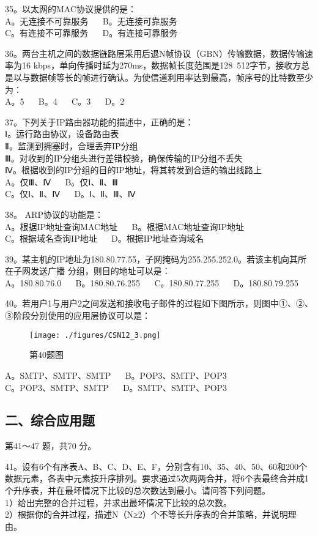 35。以太网的MAC协议提供的是：\\
A。无连接不可靠服务 $\quad$ B。无连接可靠服务 \\
C。有连接不可靠服务 $\quad$ D。有连接可靠服务

36。两台主机之间的数据链路层采用后退N帧协议（GBN）传输数据，数据传输速率为16 kbps，单向传播时延为270ms，数据帧长度范围是128~512字节，接收方总是以与数据帧等长的帧进行确认。为使信道利用率达到最高，帧序号的比特数至少为： \\
A。5 $\quad$ B。4 $\quad$ C。3 $\quad$ D。2

37。下列关于IP路由器功能的描述中，正确的是：\\
Ⅰ。运行路由协议，设备路由表 \\
Ⅱ。监测到拥塞时，合理丢弃IP分组 \\
Ⅲ。对收到的IP分组头进行差错校验，确保传输的IP分组不丢失 \\
Ⅳ。根据收到的IP分组的目的IP地址，将其转发到合适的输出线路上 \\
A。仅Ⅲ、Ⅳ  $\quad$ B。仅Ⅰ、Ⅱ、Ⅲ \\
C。仅Ⅰ、Ⅱ、Ⅳ  $\quad$ D。Ⅰ、Ⅱ、Ⅲ、Ⅳ

38。 ARP协议的功能是：\\
A。根据IP地址查询MAC地址 $\quad$ B。根据MAC地址查询IP地址 \\
C。根据域名查询IP地址 $\quad$ D。根据IP地址查询域名

39。某主机的IP地址为180.80.77.55，子网掩码为255.255.252.0。若该主机向其所在子网发送广播
分组，则目的地址可以是：\\
A。180.80.76.0 $\quad$ B。180.80.76.255 $\quad$ C。180.80.77.255 $\quad$ D。180.80.79.255

40。若用户1与用户2之间发送和接收电子邮件的过程如下图所示，则图中①、②、③阶段分别使用的应用层协议可以是：\\
\begin{figure}[ht]
\centering
\texttt{[image: ./figures/CSN12\_3.png]}
\caption{第40题图} \label{CSN12_fig3}
\end{figure}
A。SMTP、SMTP、SMTP $\quad$ B。POP3、SMTP、POP3 \\
C。POP3、SMTP、SMTP $\quad$ D。SMTP、SMTP、POP3

\subsection{二、综合应用题}
第41～47 题，共70 分。

41。设有6个有序表A、B、C、D、E、F，分别含有10、35、40、50、60和200个数据元素，各表中元素按升序排列。要求通过5次两两合并，将6个表最终合并成1个升序表，并在最坏情况下比较的总次数达到最小。请问答下列问题。\\
1）给出完整的合并过程，并求出最坏情况下比较的总次数。\\
2）根据你的合并过程，描述N（N≥2）个不等长升序表的合并策略，并说明理由。

